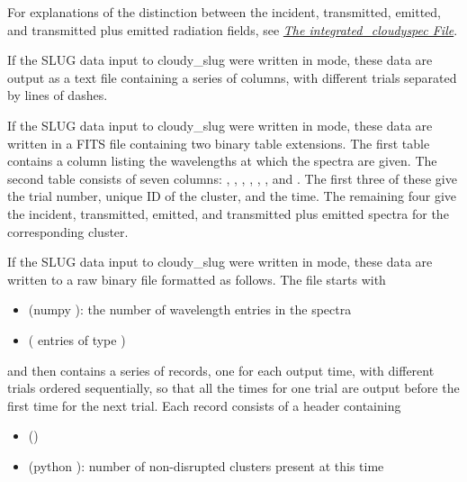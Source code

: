 \documentclass[letterpaper,10pt,english]{sphinxmanual}
\begin{document}
For explanations of the distinction between the incident, transmitted,
emitted, and transmitted plus emitted radiation fields, see
{\hyperref[cloudy:sssec\string-int\string-cloudyspec\string-file]{\emph{The integrated\_cloudyspec File}}}.

If the SLUG data input to cloudy\_slug were written in  mode,
these data are output as a text file containing a series of columns,
with different trials separated by lines of dashes.

If the SLUG data input to cloudy\_slug were written in  mode,
these data are written in a FITS file containing two binary table
extensions. The first table contains a column  listing
the wavelengths at which the spectra are given. The second table
consists of seven columns: , , ,
, , ,
and . The first three of these
give the trial number, unique ID of the cluster, and the time. The
remaining four give the incident, transmitted, emitted, and
transmitted plus emitted spectra for the corresponding cluster.

If the SLUG data input to cloudy\_slug were written in  mode,
these data are written to a raw binary file formatted as follows. The
file starts with
\begin{itemize}
\item {} 
 (numpy ): the number of wavelength entries in the spectra

\item {} 
 ( entries of type )

\end{itemize}

and then contains a series of records, one for each output time, with
different trials ordered sequentially, so that all the times for one
trial are output before the first time for the next trial. Each record
consists of a header containing
\begin{itemize}
\item {} 
 ()

\item {} 
 (python ): number of non-disrupted clusters present at this time

\end{itemize}
\end{document}
